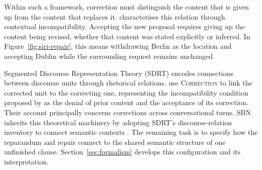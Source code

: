 Within such a framework, correction must distinguish the content that is
given up from the content that replaces it.
\citet{vanleusenIncompatibilityContextDiagnosis2004} characterises this
relation through contextual incompatibility. Accepting the new proposal
requires giving up the content being revised, whether that content was stated
explicitly or inferred. In Figure~\ref{fig:siri-repair}, this means withdrawing
Berlin as the location and accepting Dublin while the surrounding request
remains unchanged.

Segmented Discourse Representation Theory (SDRT)
\citep{asherLogicsConversation2003} encodes connections between discourse
units through rhetorical relations. \citet{lascaridesAgreementDisputesCommitments2009}
use \textsc{Correction} to link the corrected unit to the correcting one,
representing the incompatibility condition proposed by
\citet{vanleusenIncompatibilityContextDiagnosis2004} as the denial of prior
content and the acceptance of its correction. Their account principally concerns
corrections across conversational turns. SBN inherits this theoretical
machinery by adopting SDRT's discourse-relation inventory to connect semantic
contexts \citep{bosSequenceNotationCatching2023}. The remaining task is to
specify how the reparandum and repair connect to the shared semantic structure
of one unfinished clause. Section~\ref{sec:formalism} develops this
configuration and its interpretation.

